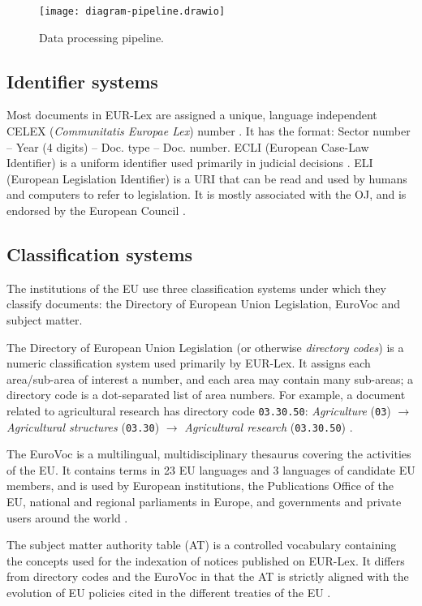 \documentclass[sigconf, authorversion]{acmart}
\begin{document}
\begin{figure*}[b]
  \texttt{[image: diagram-pipeline.drawio]}
  \caption{Data processing pipeline.}
\end{figure*}

\subsection{Identifier systems}

Most documents in EUR-Lex are assigned a unique, language independent CELEX (\textit{Communitatis Europae Lex}) number \cite{celex}. It has the format: Sector number -- Year (4 digits) -- Doc. type -- Doc. number.
ECLI (European Case-Law Identifier) is a uniform identifier used primarily in judicial decisions \cite{ecli}.
ELI (European Legislation Identifier) is a URI that can be read and used by humans and computers to refer to legislation. It is mostly associated with the OJ, and is endorsed by the European Council \cite{eli}.

\subsection{Classification systems}

The institutions of the EU use three classification systems under which they classify documents: the Directory of European Union Legislation, EuroVoc and subject matter.

The Directory of European Union Legislation (or otherwise \textit{directory codes}) is a numeric classification system used primarily by EUR-Lex. It assigns each area/sub-area of interest a number, and each area may contain many sub-areas; a directory code is a dot-separated list of area numbers. For example, a document related to agricultural research has directory code \texttt{03.30.50}: \textit{Agriculture} (\texttt{03}) $\rightarrow$ \textit{Agricultural structures} (\texttt{03.30}) $\rightarrow$ \textit{Agricultural research} (\texttt{03.30.50}) \cite{directory-legal-acts}.

The EuroVoc is a multilingual, multidisciplinary thesaurus covering the activities of the EU. It contains terms in 23 EU languages and 3 languages of candidate EU members, and is used by European institutions, the Publications Office of the EU, national and regional parliaments in Europe, and governments and private users around the world \cite{eurovoc}.

The subject matter authority table (AT) is a controlled vocabulary containing the concepts used for the indexation of notices published on EUR-Lex. It differs from directory codes and the EuroVoc in that the AT is strictly aligned with the evolution of EU policies cited in the different treaties of the EU \cite{subject-matter-at}.
\end{document}
